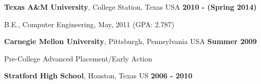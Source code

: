 \documentclass[margin,line]{res}
\newenvironment{list1}{
    \begin{list}{\ding{113}}{%
      \setlength{\itemsep}{0in}
        \setlength{\parsep}{0in} \setlength{\parskip}{0in}
        \setlength{\topsep}{0in} \setlength{\partopsep}{0in} 
    \setlength{\leftmargin}{0.17in}}}{\end{list}}
\newenvironment{list2}{
      \begin{list}{$\bullet$}{%
        \setlength{\itemsep}{0in}
          \setlength{\parsep}{0in} \setlength{\parskip}{0in}
          \setlength{\topsep}{0in} \setlength{\partopsep}{0in} 
      \setlength{\leftmargin}{0.2in}}}{\end{list}}
\begin{document}
{\begin{resume}
          {\bf Texas A\&M University}, College Station, Texas USA \hfill {\bf 2010 - (Spring 2014)}\\
          \vspace*{-.17in}
          \begin{list1}
          \item[] B.E., Computer Engineering, May, 2011 \hfill (GPA: 2.787)
          \end{list1}
          \vspace*{-.15in}

          {\bf Carnegie Mellon University}, Pittsburgh, Pennsylvania USA \hfill {\bf Summer 2009}\\
          \vspace*{-.17in}
          \begin{list1}
          \item[] Pre-College Advanced Placement/Early Action \hfill\\
            \vspace{-.15in}
          \end{list1}

          \vspace*{-.165in}
          {\bf Stratford High School}, Houston, Texas US \hfill {\bf 2006 - 2010}\\
          \vspace*{-.165in}




\end{resume}}
\end{document}
